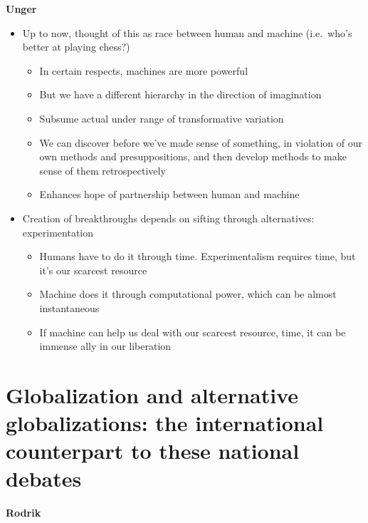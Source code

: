 \textbf{Unger}

\begin{itemize}
\tightlist
\item
  Up to now, thought of this as race between human and machine
  (i.e.~who's better at playing chess?)

  \begin{itemize}
  \tightlist
  \item
    In certain respects, machines are more powerful
  \item
    But we have a different hierarchy in the direction of imagination
  \item
    Subsume actual under range of transformative variation
  \item
    We can discover before we've made sense of something, in violation
    of our own methods and presuppositions, and then develop methods to
    make sense of them retrospectively
  \item
    Enhances hope of partnership between human and machine
  \end{itemize}
\item
  Creation of breakthroughs depends on sifting through alternatives:
  experimentation

  \begin{itemize}
  \tightlist
  \item
    Humans have to do it through time. Experimentalism requires time,
    but it's our scarcest resource
  \item
    Machine does it through computational power, which can be almost
    instantaneous
  \item
    If machine can help us deal with our scarcest resource, time, it can
    be immense ally in our liberation
  \end{itemize}
\end{itemize}

\hypertarget{globalization-and-alternative-globalizations-the-international-counterpart-to-these-national-debates}{%
\section{Globalization and alternative globalizations: the international
counterpart to these national
debates}\label{globalization-and-alternative-globalizations-the-international-counterpart-to-these-national-debates}}

\textbf{Rodrik}

